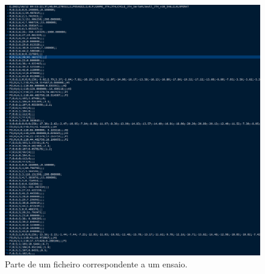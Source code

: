 \begin{figure}[H]
\centering
\includegraphics[scale=0.3]{figs/ensaio}
\caption{Parte de um ficheiro correspondente a um ensaio.}\label{ensaio}
\end{figure}









